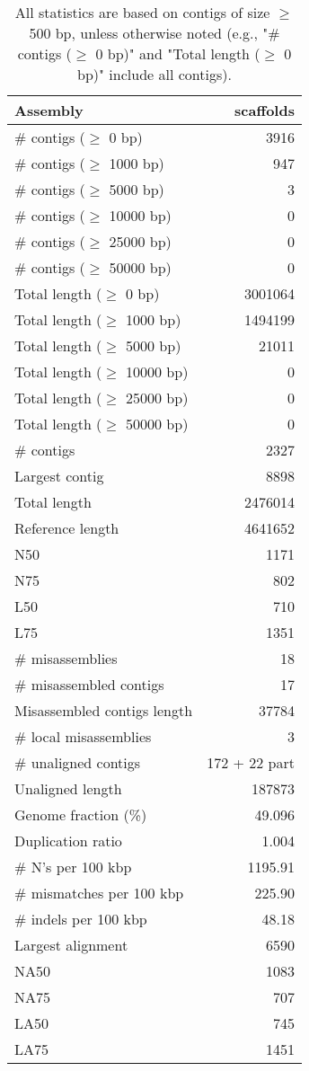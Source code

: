 \documentclass[12pt,a4paper]{article}
\begin{document}
\begin{table}[ht]
\begin{center}
\caption{All statistics are based on contigs of size $\geq$ 500 bp, unless otherwise noted (e.g., "\# contigs ($\geq$ 0 bp)" and "Total length ($\geq$ 0 bp)" include all contigs).}
\begin{tabular}{|l*{1}{|r}|}
\hline
Assembly & scaffolds \\ \hline
\# contigs ($\geq$ 0 bp) & 3916 \\ \hline
\# contigs ($\geq$ 1000 bp) & 947 \\ \hline
\# contigs ($\geq$ 5000 bp) & 3 \\ \hline
\# contigs ($\geq$ 10000 bp) & 0 \\ \hline
\# contigs ($\geq$ 25000 bp) & 0 \\ \hline
\# contigs ($\geq$ 50000 bp) & 0 \\ \hline
Total length ($\geq$ 0 bp) & 3001064 \\ \hline
Total length ($\geq$ 1000 bp) & 1494199 \\ \hline
Total length ($\geq$ 5000 bp) & 21011 \\ \hline
Total length ($\geq$ 10000 bp) & 0 \\ \hline
Total length ($\geq$ 25000 bp) & 0 \\ \hline
Total length ($\geq$ 50000 bp) & 0 \\ \hline
\# contigs & 2327 \\ \hline
Largest contig & 8898 \\ \hline
Total length & 2476014 \\ \hline
Reference length & 4641652 \\ \hline
N50 & 1171 \\ \hline
N75 & 802 \\ \hline
L50 & 710 \\ \hline
L75 & 1351 \\ \hline
\# misassemblies & 18 \\ \hline
\# misassembled contigs & 17 \\ \hline
Misassembled contigs length & 37784 \\ \hline
\# local misassemblies & 3 \\ \hline
\# unaligned contigs & 172 + 22 part \\ \hline
Unaligned length & 187873 \\ \hline
Genome fraction (\%) & 49.096 \\ \hline
Duplication ratio & 1.004 \\ \hline
\# N's per 100 kbp & 1195.91 \\ \hline
\# mismatches per 100 kbp & 225.90 \\ \hline
\# indels per 100 kbp & 48.18 \\ \hline
Largest alignment & 6590 \\ \hline
NA50 & 1083 \\ \hline
NA75 & 707 \\ \hline
LA50 & 745 \\ \hline
LA75 & 1451 \\ \hline
\end{tabular}
\end{center}
\end{table}
\end{document}
